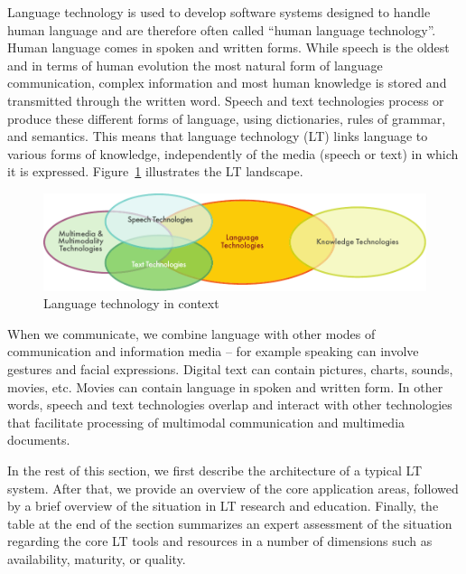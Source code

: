 \documentclass[]{../../metanetpaper}
\begin{document}
\begin{multicols}{2}
Language technology is used to develop software systems designed to handle human language and are therefore often called “human language technology”. Human language comes in spoken and written forms. While speech is the oldest and in terms of human evolution the most natural form of language communication, complex information and most human knowledge is stored and transmitted through the written word. Speech and text technologies process or produce these different forms of language, using dictionaries, rules of grammar, and semantics. This means that language technology (LT) links language to various forms of knowledge, independently of the media (speech or text) in which it is expressed. Figure~\ref{fig:ltincontext_en} illustrates the LT landscape.

\begin{figure}[htb]
  \center
  \includegraphics[width=\textwidth]{../_media/english/language_technologies}
  \caption{Language technology in context}
  \label{fig:ltincontext_en}
\end{figure}

 When we communicate, we combine language with other modes of communication and information media – for example speaking can involve gestures and facial expressions. Digital text can contain pictures, charts, sounds, movies, etc. Movies can contain language in spoken and written form. In other words, speech and text technologies overlap and interact with other technologies that facilitate processing of multimodal communication and multimedia documents.

In the rest of this section, we first describe the architecture of a typical LT system. After that, we provide an overview of the core application areas, followed by a brief overview of the situation in LT research and education. Finally, the table at the end of the section summarizes an expert assessment of the situation regarding the core LT tools and resources in a number of dimensions such as availability, maturity, or quality.


\end{multicols}
\end{document}
